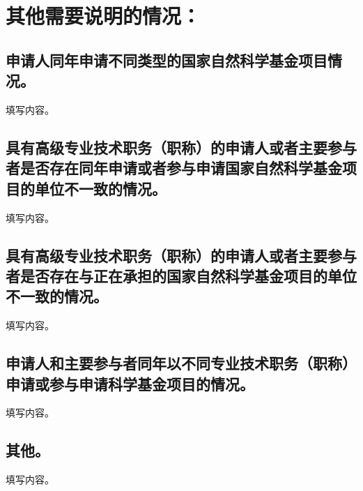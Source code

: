 \par
\chapter{\textbf{其他需要说明的情况：}}

\section{申请人同年申请不同类型的国家自然科学基金项目情况。}
填写内容。

\section{具有高级专业技术职务（职称）的申请人或者主要参与者是否存在同年申请或者参与申请国家自然科学基金项目的单位不一致的情况。}
填写内容。

\section{具有高级专业技术职务（职称）的申请人或者主要参与者是否存在与正在承担的国家自然科学基金项目的单位不一致的情况。}
填写内容。

\section{申请人和主要参与者同年以不同专业技术职务（职称）申请或参与申请科学基金项目的情况。}
填写内容。

\section{其他。}
填写内容。
